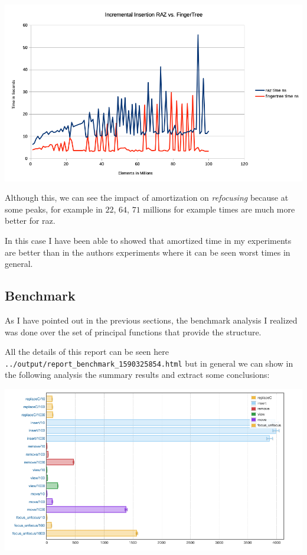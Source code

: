\documentclass[12pt, a4paper]{article}
\begin{document}
\begin{minipage}[t]{\linewidth}
  \includegraphics[width=\textwidth]{raz_ftree_exp_2}
  \captionsetup{type=figure}
  \label{fig:raz_ftree_2}
\end{minipage}

Although this, we can see the impact of amortization on \textit{refocusing} because at some peaks, for example in $22$, $64$, $71$ millions for example times are much more better for \acrshort{raz}.

In this case I have been able to showed that amortized time in my experiments are better than in the authors experiments where it can be seen worst times in general.


\subsection{Benchmark}
As I have pointed out in the previous sections, the benchmark analysis I realized was done over the set of principal functions that provide the structure.

All the details of this report can be seen here \texttt{../output/report_benchmark_1590325854.html} but in general we can show in the following analysis the summary results and extract some conclusions:


\begin{minipage}[t]{\linewidth}
  \includegraphics[width=\textwidth]{raz_bench}
  \captionsetup{type=figure}
  \label{fig:raz_bench}
\end{minipage}
\end{document}
